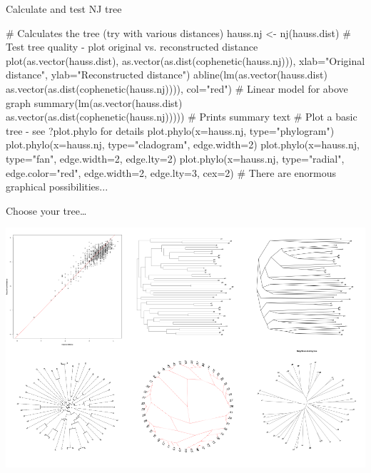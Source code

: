 \documentclass[compress, ucs, xelatex, 11pt, xcolor=svgnames,
  hyperref={
    bookmarks=true,
    unicode=true,
    colorlinks=true,
    pdftitle={Molecular data in R},
    plainpages=false,
    pdfauthor={Vojtech Zeisek},
    pdfsubject={Course about phylogeny and evolution in R},
    pdfcreator={XeLaTeX},
    pdfkeywords={R, evolution, phylogeny, molecular data},
    linkcolor=Tomato,
    anchorcolor=SaddleBrown,
    citecolor=Goldenrod,
    filecolor=DarkMagenta,
    menucolor=Sienna,
    urlcolor=DarkTurquoise,
    pdftex},
  url={hyphens, lowtilde} %
  ]{beamer}
\begin{document}
\begin{frame}[fragile]{Calculate and test NJ tree}
  \label{NJ}
  \begin{spluscode}
    # Calculates the tree (try with various distances)
    hauss.nj <- nj(hauss.dist)
    # Test tree quality - plot original vs. reconstructed distance
    plot(as.vector(hauss.dist), as.vector(as.dist(cophenetic(hauss.nj))),
      xlab="Original distance", ylab="Reconstructed distance")
    abline(lm(as.vector(hauss.dist) ~
      as.vector(as.dist(cophenetic(hauss.nj)))), col="red")
    # Linear model for above graph
    summary(lm(as.vector(hauss.dist) ~
      as.vector(as.dist(cophenetic(hauss.nj))))) # Prints summary text
    # Plot a basic tree - see ?plot.phylo for details
    plot.phylo(x=hauss.nj, type="phylogram")
    plot.phylo(x=hauss.nj, type="cladogram", edge.width=2)
    plot.phylo(x=hauss.nj, type="fan", edge.width=2, edge.lty=2)
    plot.phylo(x=hauss.nj, type="radial", edge.color="red",
      edge.width=2, edge.lty=3, cex=2)
    # There are enormous graphical possibilities...
  \end{spluscode}
\end{frame}

\begin{frame}{Choose your tree\ldots}
  \begin{center}
    \includegraphics[width=\textwidth-1.5cm]{nj1.png}
  \end{center}
\end{frame}
\end{document}

